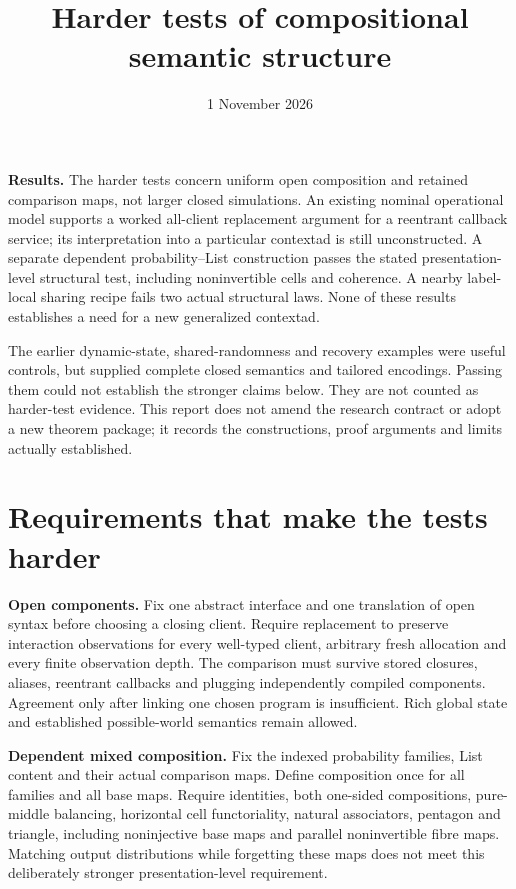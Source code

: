 \documentclass[11pt,a4paper]{article}
\title{Harder tests of compositional semantic structure}
\author{}
\date{1 November 2026}
\begin{document}
\maketitle
\vspace{-1.5em}

\textbf{Results.} The harder tests concern uniform open composition and retained
comparison maps, not larger closed simulations. An existing nominal operational
model supports a worked all-client replacement argument for a reentrant callback
service; its interpretation into a particular contextad is still unconstructed.
A separate dependent probability--List construction passes the stated
presentation-level structural test, including noninvertible cells and coherence.
A nearby label-local sharing recipe fails two actual structural laws. None of
these results establishes a need for a new generalized contextad.

The earlier dynamic-state, shared-randomness and recovery examples were useful
controls, but supplied complete closed semantics and tailored encodings. Passing
them could not establish the stronger claims below. They are not counted as
harder-test evidence. This report does not amend the research contract or adopt
a new theorem package; it records the constructions, proof arguments and limits
actually established.

\section{Requirements that make the tests harder}

\textbf{Open components.} Fix one abstract interface and one translation of
open syntax before choosing a closing client. Require replacement to preserve
interaction observations for every well-typed client, arbitrary fresh allocation
and every finite observation depth. The comparison must survive stored closures,
aliases, reentrant callbacks and plugging independently compiled components.
Agreement only after linking one chosen program is insufficient. Rich global
state and established possible-world semantics remain allowed.

\textbf{Dependent mixed composition.} Fix the indexed probability families,
List content and their actual comparison maps. Define composition once for all
families and all base maps. Require identities, both one-sided compositions,
pure-middle balancing, horizontal cell functoriality, natural associators,
pentagon and triangle, including noninjective base maps and parallel
noninvertible fibre maps. Matching output distributions while forgetting these
maps does not meet this deliberately stronger presentation-level requirement.
\end{document}
